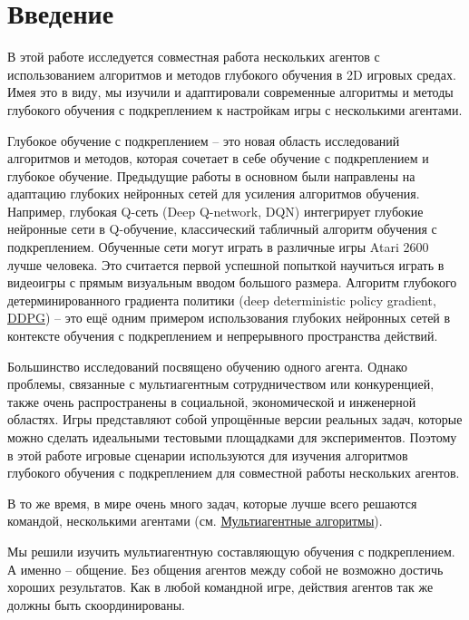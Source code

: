 \chapter*{Введение} \label{intro}%

В этой работе исследуется совместная работа нескольких агентов с использованием алгоритмов и методов глубокого обучения в 2D игровых средах. Имея это в виду, мы изучили и адаптировали современные алгоритмы и методы глубокого обучения с подкреплением к настройкам игры с несколькими агентами.

Глубокое обучение с подкреплением -- это новая область исследований алгоритмов и методов, которая сочетает в себе обучение с подкреплением и глубокое обучение. Предыдущие работы в основном были направлены на адаптацию глубоких нейронных сетей для усиления алгоритмов обучения. Например, глубокая Q-сеть (Deep Q-network, DQN) \cite{Mnih2015} интегрирует глубокие нейронные сети в Q-обучение, классический табличный алгоритм обучения с подкреплением. Обученные сети могут играть в различные игры Atari 2600 \cite{Bellemare_2013} лучше человека. Это считается первой успешной попыткой научиться играть в видеоигры с прямым визуальным вводом большого размера. Алгоритм глубокого детерминированного градиента политики (deep deterministic policy gradient, \hyperref[acr:ddpg]{DDPG}) \cite{lillicrap2015continuous} -- это ещё одним примером использования глубоких нейронных сетей в контексте обучения с подкреплением и непрерывного пространства действий.

Большинство исследований посвящено обучению одного агента. Однако проблемы, связанные с мультиагентным сотрудничеством или конкуренцией, также очень распространены в социальной, экономической и инженерной областях. Игры представляют собой упрощённые версии реальных задач, которые можно сделать идеальными тестовыми площадками для экспериментов. Поэтому в этой работе игровые сценарии используются для изучения алгоритмов глубокого обучения с подкреплением для совместной работы нескольких агентов.

В то же время, в мире очень много задач, которые лучше всего решаются командой, несколькими агентами (см. \hyperref[ch2:ma-algs]{Мультиагентные алгоритмы}).

Мы решили изучить мультиагентную составляющую обучения с подкреплением. А именно -- общение. Без общения агентов между собой не возможно достичь хороших результатов. Как в любой командной игре, действия агентов так же должны быть скоординированы.

